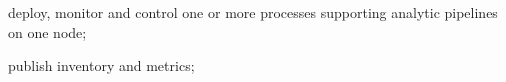 \begin{description}
  \item deploy, monitor and control one or more  processes supporting analytic pipelines on one node;
  \item publish inventory and metrics;
\end{description}